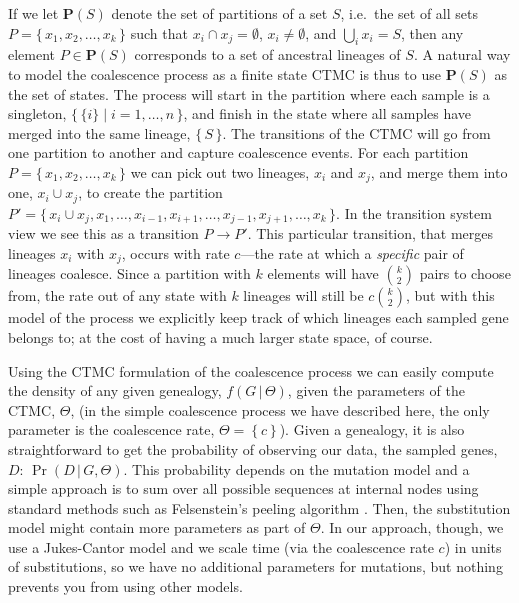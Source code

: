 \documentclass[graybox]{svmult}
\newcommand{\partition}{\ensuremath{\mathbf{P}}}
\newcommand{\G}{\ensuremath{G}}
\renewcommand{\D}{\ensuremath{D}}
\begin{document}
If we let $\partition\left(S\right)$ denote the set of partitions of a set $S$, i.e.\ the set of all sets $P=\{\,x_1,x_2,\ldots,x_k\,\}$ such that $x_i\cap x_j=\emptyset$, $x_i\neq\emptyset$, and $\bigcup_i x_i = S$, then any element $P\in\partition\left(S\right)$ corresponds to a set of ancestral lineages of $S$. A natural way to model the coalescence process as a finite state CTMC is thus to use $\partition\left(S\right)$ as the set of states. The process will start in the partition where each sample is a singleton, $\{\,\{i\}\;|\;i=1,\ldots,n\,\}$, and finish in the state where all samples have merged into the same lineage, $\{\,S\,\}$. The transitions of the CTMC will go from one partition to another and capture coalescence events. For each partition $P=\{\,x_1,x_2,\ldots,x_k\,\}$ we can pick out two lineages, $x_i$ and $x_j$, and merge them into one, $x_i\cup x_j$, to create the partition $P'=\{\,x_i\cup x_j,x_1,\ldots,x_{i-1},x_{i+1},\ldots,x_{j-1},x_{j+1},\ldots,x_k\,\}$. In the transition system view we see this as a transition $P\to P'$. This particular transition, that merges lineages $x_i$ with $x_j$, occurs with rate $c$---the rate at which a \emph{specific} pair of lineages coalesce. Since a partition with $k$ elements will have $k \choose 2$ pairs to choose from, the rate out of any state with $k$ lineages will still be $c{k \choose 2}$, but with this model of the process we explicitly keep track of which lineages each sampled gene belongs to; at the cost of having a much larger state space, of course.


Using the CTMC formulation of the coalescence process we can easily compute the density of any given genealogy, $f(\G\,|\,\Theta)$, given the parameters of the CTMC, $\Theta$, (in the simple coalescence process we have described here, the only parameter is the coalescence rate, $\Theta = \left\{c\right\}$). Given a genealogy, it is also straightforward to get the probability of observing our data, the sampled genes, $\D$: $\Pr(\D\,|\,\G,\Theta)$. This probability depends on the mutation model and a simple approach is to sum over all possible sequences at internal nodes using standard methods such as Felsenstein's peeling algorithm \cite{Felsenstein_1981}. Then, the substitution model might contain more parameters as part of $\Theta$. In our approach, though, we use a Jukes-Cantor model and we scale time (via the coalescence rate $c$) in units of substitutions, so we have no additional parameters for mutations, but nothing prevents you from using other models.
\end{document}
